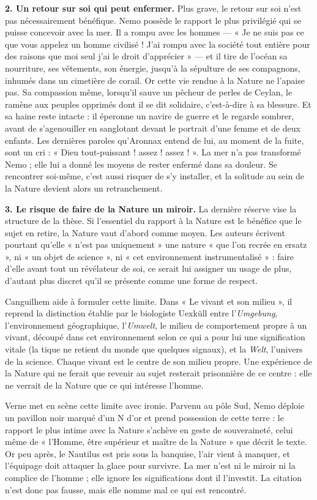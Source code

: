 \documentclass[11pt,a4paper]{article}
\begin{document}
\textbf{2. Un retour sur soi qui peut enfermer.} Plus grave, le retour sur soi n'est pas nécessairement bénéfique. Nemo possède le rapport le plus privilégié qui se puisse concevoir avec la mer. Il a rompu avec les hommes --- « Je ne suis pas ce que vous appelez un homme civilisé ! J'ai rompu avec la société tout entière pour des raisons que moi seul j'ai le droit d'apprécier » --- et il tire de l'océan sa nourriture, ses vêtements, son énergie, jusqu'à la sépulture de ses compagnons, inhumés dans un cimetière de corail. Or cette vie rendue à la Nature ne l'apaise pas. Sa compassion même, lorsqu'il sauve un pêcheur de perles de Ceylan, le ramène aux peuples opprimés dont il se dit solidaire, c'est-à-dire à sa blessure. Et sa haine reste intacte : il éperonne un navire de guerre et le regarde sombrer, avant de s'agenouiller en sanglotant devant le portrait d'une femme et de deux enfants. Les dernières paroles qu'Aronnax entend de lui, au moment de la fuite, sont un cri : « Dieu tout-puissant ! assez ! assez ! ». La mer n'a pas transformé Nemo ; elle lui a donné les moyens de rester enfermé dans sa douleur. Se rencontrer soi-même, c'est aussi risquer de s'y installer, et la solitude au sein de la Nature devient alors un retranchement.

\textbf{3. Le risque de faire de la Nature un miroir.} La dernière réserve vise la structure de la thèse. Si l'essentiel du rapport à la Nature est le bénéfice que le sujet en retire, la Nature vaut d'abord comme moyen. Les auteurs écrivent pourtant qu'elle « n'est pas uniquement » une nature « que l'on recrée en ersatz », ni « un objet de science », ni « cet environnement instrumentalisé » : faire d'elle avant tout un révélateur de soi, ce serait lui assigner un usage de plus, d'autant plus discret qu'il se présente comme une forme de respect.

Canguilhem aide à formuler cette limite. Dans « Le vivant et son milieu », il reprend la distinction établie par le biologiste Uexküll entre l'\emph{Umgebung}, l'environnement géographique, l'\emph{Umwelt}, le milieu de comportement propre à un vivant, découpé dans cet environnement selon ce qui a pour lui une signification vitale (la tique ne retient du monde que quelques signaux), et la \emph{Welt}, l'univers de la science. Chaque vivant est le centre de son milieu propre. Une expérience de la Nature qui ne ferait que revenir au sujet resterait prisonnière de ce centre : elle ne verrait de la Nature que ce qui intéresse l'homme.

Verne met en scène cette limite avec ironie. Parvenu au pôle Sud, Nemo déploie un pavillon noir marqué d'un N d'or et prend possession de cette terre : le rapport le plus intime avec la Nature s'achève en geste de souveraineté, celui même de « l'Homme, être supérieur et maître de la Nature » que décrit le texte. Or peu après, le Nautilus est pris sous la banquise, l'air vient à manquer, et l'équipage doit attaquer la glace pour survivre. La mer n'est ni le miroir ni la complice de l'homme ; elle ignore les significations dont il l'investit. La citation n'est donc pas fausse, mais elle nomme mal ce qui est rencontré.
\end{document}
